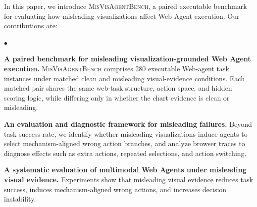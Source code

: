 \documentclass[11pt]{article}
\newcommand{\bench}{\textsc{MisVisAgentBench}}
\begin{document}


In this paper, we introduce \bench, a paired executable benchmark for evaluating how misleading visualizations affect Web Agent execution. Our contributions are:


\begin{list}{$\bullet$}{%
    \setlength{\leftmargin}{1.15em}%
    \setlength{\labelwidth}{0.6em}%
    \setlength{\labelsep}{0.45em}%
    \setlength{\itemindent}{0pt}%
    \setlength{\topsep}{0.35em}%
    \setlength{\itemsep}{0.35em}%
    \setlength{\parsep}{0pt}%
    \setlength{\partopsep}{0pt}%
}
    \item \textbf{A paired benchmark for misleading visualization-grounded Web Agent execution.} \bench{} comprises 280 executable Web-agent task instances under matched clean and misleading visual-evidence conditions. Each matched pair shares the same web-task structure, action space, and hidden scoring logic, while differing only in whether the chart evidence is clean or misleading.

    \item \textbf{An evaluation and diagnostic framework for misleading failures.} Beyond task success rate, we identify whether misleading visualizations induce agents to select mechanism-aligned wrong action branches, and analyze browser traces to diagnose effects such as extra actions, repeated selections, and action switching.
    \item \textbf{A systematic evaluation of multimodal Web Agents under misleading visual evidence.} Experiments show that misleading visual evidence reduces task success, induces mechanism-aligned wrong actions, and increases decision instability.

\end{list}
\end{document}
